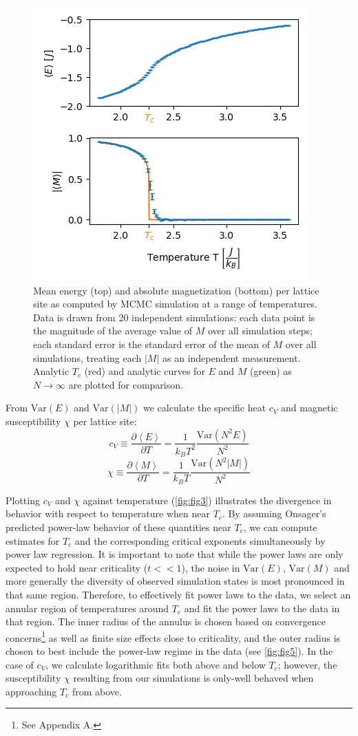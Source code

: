 \documentclass[letter,scriptaddress,twocolumn, prl,nofootinbib]{revtex4}
\newcommand{\submin}[1]{\left\langle #1 \right\rangle}
\newcommand{\Var}[1]{\text{Var}\left( #1 \right)}
\begin{document}
\begin{figure}[h]
	\begin{center}
		\includegraphics[width=.5\textwidth]{figs/fig2_EMplots.png}
		\caption{Mean energy (top) and absolute magnetization (bottom) per lattice site as computed by MCMC simulation at a range of temperatures. Data is drawn from 20 independent simulations: each data point is the magnitude of the average value of $M$ over all simulation steps; each standard error is the standard error of the mean of $M$ over all simulations, treating each $|M|$ as an independent measurement. Analytic $T_c$ (red) and analytic curves for $E$ and $M$ (green) as $N\rightarrow\infty$ are plotted for comparison.}
		\label{fig:fig2}
	\end{center}
\end{figure}

From $\Var{E}$ and $\Var{|M|}$ we calculate the specific heat $c_V$ and magnetic susceptibility $\chi$ per lattice site:
\begin{equation}
	c_V \equiv \frac{\partial \submin{E}}{\partial T} = \frac{1}{k_BT^2}\frac{\Var{N^2 E}}{N^2} \label{eq:cv}
\end{equation}
\begin{equation}
	\chi \equiv \frac{\partial \submin{M}}{\partial T} = \frac{1}{k_BT}\frac{\Var{N^2 |M|}}{N^2}	\label{eq:chi}
\end{equation}

Plotting $c_V$ and $\chi$ against temperature (\autoref{fig:fig3}) illustrates the divergence in behavior with respect to temperature when near $T_c$. By assuming Onsager's predicted power-law behavior of these quantities near $T_c$, we can compute estimates for $T_c$ and the corresponding critical exponents simultaneously by power law regression. It is important to note that while the power laws are only expected to hold near criticality ($t << 1$), the noise in $\Var{E}$, $\Var{M}$ and more generally the diversity of observed simulation states is most pronounced in that same region. Therefore, to effectively fit power laws to the data, we select an annular region of temperatures around $T_c$ and fit the power laws to the data in that region. The inner radius of the annulus is chosen based on convergence concerns\footnote{See Appendix A.} as well as finite size effects close to criticality, and the outer radius is chosen to best include the power-law regime in the data (see \autoref{fig:fig5}). In the case of $c_V$, we calculate logarithmic fits both above and below $T_c$; however, the susceptibility $\chi$ resulting from our simulations is only-well behaved when approaching $T_c$ from above.
\end{document}

